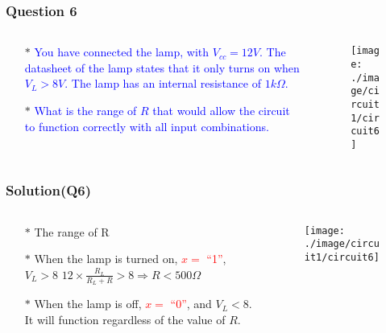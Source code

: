 \documentclass{beamer}
\newcommand{\blue}[1]{\textcolor{blue}{#1}}
\newcommand{\red}[1]{\textcolor{red}{#1}}
\begin{document}
\begin{frame}
\frametitle{Question 6}
\begin{columns}

\begin{column}{6cm}
\begin{itemize} \itemsep1pt \parskip0pt 
  \item[$\ast$] \blue{You have connected the lamp, with $V_{cc} = 12V$. The datasheet of the lamp states that it only turns on when $V_L > 8V$. The lamp has an internal resistance of $1k \Omega$.}
  \item[$\ast$] \blue{What is the range of $R$ that would allow the circuit to function correctly with all input combinations.}
\end{itemize}
\end{column}


\begin{column}{6cm}
\begin{figure}[H]
  \centering
  \texttt{[image: ./image/circuit1/circuit6]}
\end{figure}
\end{column}

\end{columns}

\end{frame}


\begin{frame}
\frametitle{Solution(Q6)}

\begin{columns}

\begin{column}{6cm}
\begin{itemize} \itemsep1pt \parskip0pt 
  \item[$\ast$] The range of R
  \item[$\ast$] When the lamp is turned on, \red{$x =$ ``1''}, $V_L > 8$ \newline$12 \times \frac{R_L}{R_L + R} > 8 \Rightarrow R < 500 \Omega$
  \item[$\ast$] When the lamp is off, \red{$x =$ ``0''}, and $V_L < 8$. It will function regardless of the value of $R$.
\end{itemize}
\end{column}


\begin{column}{6cm}
\begin{figure}[H]
  \centering
  \texttt{[image: ./image/circuit1/circuit6]}
\end{figure}
\end{column}

\end{columns}

\end{frame}
\end{document}

